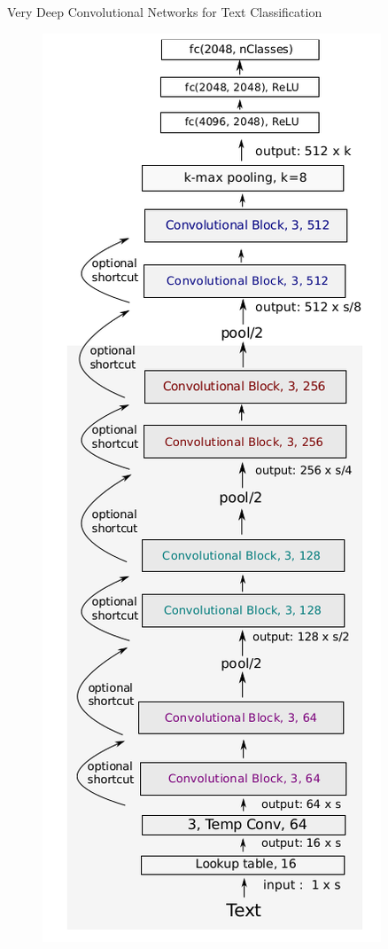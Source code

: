 \documentclass[handout]{beamer}
\begin{document}
\begin{frame}{Very Deep Convolutional Networks for Text Classification}

  \begin{figure}[h]
        	\includegraphics[scale = 0.2]{pics/VDCNN.png}
        \end{figure}

\end{frame}
\end{document}
